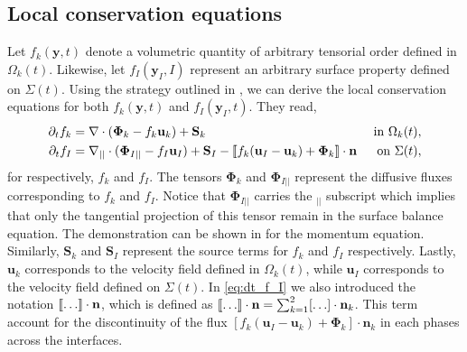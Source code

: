 \subsection{Local conservation equations}

Let $f_k(\textbf{y},t)$ denote a volumetric quantity of arbitrary tensorial order defined in $\Omega_k(t)$.
Likewise, let $f_I(\textbf{y}_I,I)$ represent an arbitrary surface property defined on $\Sigma(t)$.
Using the strategy outlined in \citep{bothe2022sharp,morel2015mathematical,slattery2007interfacial}, we can derive the local conservation equations for both $f_k(\textbf{y},t)$ and $f_I(\textbf{y}_I,t)$.
They read,  
\begin{align}
    \label{eq:dt_f_k}
    \partial_t f_k
    &= \mathbf{\nabla} \cdot \left(
        \mathbf{\Phi}_k
        - f_k\textbf{u}_k
        \right)
    + \textbf{S}_k
    & \text{ in } \Omega_k(t),&\\
    \partial_t f_I  
    &= 
    \mathbf{\nabla}_{||} \cdot (\mathbf{\Phi}_{I||} - f_I \textbf{u}_I)
    + \textbf{S}_I
    - \llbracket 
        f_k (\textbf{u}_I - \textbf{u}_k)
        + \mathbf{\Phi}_k
      \rrbracket \cdot \textbf{n} 
    & \text{ on } \Sigma(t),&
    \label{eq:dt_f_I}
\end{align}
for respectively, $f_k$ and $f_I$.
The tensors $\mathbf{\Phi}_k$ and $\mathbf{\Phi}_{I||}$ represent the diffusive fluxes corresponding to $f_k$ and $f_I$. 
Notice that $\mathbf{\Phi}_{I||}$ carries the $_{||}$ subscript which implies that only the tangential projection of this tensor remain in the surface balance equation. 
The demonstration can be shown in \citet[Chapter 2]{slattery2007interfacial} for the momentum equation. 
Similarly, $\textbf{S}_k$ and $\textbf{S}_I$ represent the source terms for $f_k$ and $f_I$ respectively.
Lastly, $\textbf{u}_k$ corresponds to the velocity field defined in $\Omega_k(t)$, while $\textbf{u}_I$ corresponds to the velocity field defined on $\Sigma(t)$.
In \ref{eq:dt_f_I} we also introduced the notation $\llbracket \ldots \rrbracket \cdot \textbf{n}$, which is defined as $\llbracket \ldots \rrbracket \cdot \textbf{n} = \sum_{k=1}^2 [\ldots] \cdot \textbf{n}_k$.
This term account for the discontinuity of the flux $\left[f_k (\textbf{u}_I - \textbf{u}_k)+ \mathbf{\Phi}_k\right]\cdot\textbf{n}_k$ in each phases across the interfaces.

